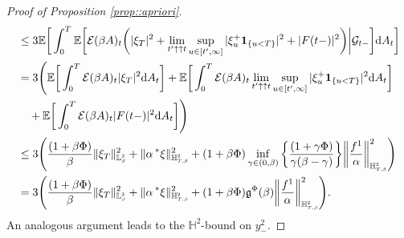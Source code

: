 \documentclass[10pt]{article} %
\newcommand\cE{\mathcal E}
\newcommand\cG{\mathcal G}
\newcommand{\smalltext}[1]{\text{\fontsize{4}{4}\selectfont$#1$}}
\newcommand\fg{\mathfrak g}
\def \E{\mathbb{E}}
\def \H{\mathbb{H}}
\def \L{\mathbb{L}}
\newcommand{\brs}[1]{\prescript{\ast}{}{#1}}
\newcommand{\1}{\mathbf{1}}
\def\d{\mathrm{d}}
\begin{document}
\begin{proof}[Proof of Proposition \ref{prop::apriori}]
\begin{align*}
	&\leq 3\E\bigg[ \int_0^T \E \bigg[\cE(\beta A)_t\bigg(|\xi_T|^2 +\lim_{t^\prime \uparrow\uparrow t}\sup_{u \in [t^\prime,\infty]}|\xi^+_u \mathbf{1}_{\{u < T\}}|^2 +  |F(t-)|^2\bigg) \bigg| \cG_{t-} \bigg] \d A_t \bigg] \\
	&= 3\Bigg(\E \bigg[ \int_0^T \cE(\beta A)_t |\xi_T|^2 \d A_t \bigg] + \E \bigg[ \int_0^T \cE(\beta A)_t \lim_{t^\prime \uparrow\uparrow t}\sup_{u \in [t^\prime,\infty]}|\xi^+_u \mathbf{1}_{\{u < T\}}|^2 \d A_t \bigg] \\
	&\quad+ \E \bigg[ \int_0^T \cE(\beta A)_t |F(t-)|^2 \d A_t \bigg] \Bigg) \\
	&\leq 3 \Bigg( \frac{(1+\beta\Phi)}{\beta} \|\xi_T\|^2_{\L^\smalltext{2}_\smalltext{\beta}} + \|\alpha\brs{\xi}\|^2_{\H^\smalltext{2}_{\smalltext{T}\smalltext{,}\smalltext{\beta}}} +  (1+\beta\Phi) \inf_{\gamma \in (0,\beta)}\bigg\{\frac{(1+\gamma\Phi)}{\gamma(\beta-\gamma)}\bigg\} \bigg\| \frac{f^1}{\alpha} \bigg\|^2_{\H^{\smalltext{2}}_{\smalltext{T}\smalltext{,}\smalltext{\beta}}} \Bigg) \\
	&= 3 \Bigg( \frac{(1+\beta\Phi)}{\beta} \|\xi_T\|^2_{\L^\smalltext{2}_\smalltext{\beta}} + \|\alpha\brs{\xi}\|^2_{\H^\smalltext{2}_{\smalltext{T}\smalltext{,}\smalltext{\beta}}} +  (1+\beta\Phi) \fg^\Phi(\beta) \bigg\| \frac{f^1}{\alpha} \bigg\|^2_{\H^{\smalltext{2}}_{\smalltext{T}\smalltext{,}\smalltext{\beta}}} \Bigg).
\end{align*}
An analogous argument leads to the $\H^2$-bound on $y^2_-$. 


\end{proof}
\end{document}
